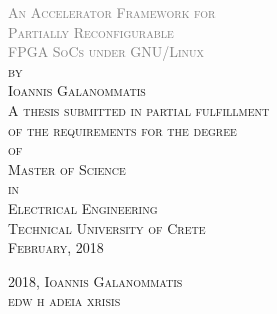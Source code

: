 \thispagestyle{empty}
\begin{center}
	\textsc{
	\textcolor{gray} {\huge
		An Accelerator Framework for\\ 
		Partially Reconfigurable \\
		FPGA SoCs under GNU/Linux\\
	}
	\vspace{50pt}
	by\\
	\vspace{20pt}
	\large Ioannis Galanommatis\\
	\vspace{80pt}
		A thesis submitted in partial fulfillment\\
		of the requirements for the degree\\
		\vspace{12pt}
		of\\
		\vspace{12pt}
		{\large Master of Science\\}
		\vspace{12pt}
		in\\
		\vspace{12pt}
		{\large Electrical Engineering\\}
	}
	\vspace*{\fill}
	\textsc{\large Technical University of Crete\\February, 2018\\}
	
\end{center}

\newpage

\thispagestyle{empty}
\vspace*{\fill}
\scshape \noindent \small 2018, Ioannis Galanommatis \\
\noindent edw h adeia xrisis
\vspace*{\fill}
